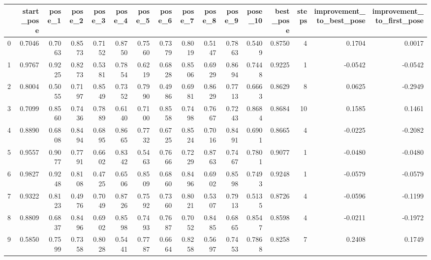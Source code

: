 \begin{tabular}{lrrrrrrrrrrrrrrr}
\toprule
{} &  start\_pose &  pose\_1 &  pose\_2 &  pose\_3 &  pose\_4 &  pose\_5 &  pose\_6 &  pose\_7 &  pose\_8 &  pose\_9 &  pose\_10 &  best\_pose &  steps &  improvement\_to\_best\_pose &  improvement\_to\_first\_pose \\
\midrule
0  &      0.7046 &  0.7063 &  0.8573 &  0.7152 &  0.8750 &  0.7560 &  0.7379 &  0.8019 &  0.5147 &  0.7863 &   0.5409 &     0.8750 &      4 &                    0.1704 &                     0.0017 \\
1  &      0.9767 &  0.9225 &  0.8273 &  0.5381 &  0.7854 &  0.6219 &  0.6828 &  0.8506 &  0.6929 &  0.8694 &   0.7448 &     0.9225 &      1 &                   -0.0542 &                    -0.0542 \\
2  &      0.8004 &  0.5055 &  0.7197 &  0.8549 &  0.7352 &  0.7990 &  0.4986 &  0.6981 &  0.8629 &  0.7713 &   0.6663 &     0.8629 &      8 &                    0.0625 &                    -0.2949 \\
3  &      0.7099 &  0.8560 &  0.7436 &  0.7889 &  0.6140 &  0.7100 &  0.8558 &  0.7498 &  0.7667 &  0.7243 &   0.8684 &     0.8684 &     10 &                    0.1585 &                     0.1461 \\
4  &      0.8890 &  0.6808 &  0.8494 &  0.6895 &  0.8665 &  0.7732 &  0.6725 &  0.8524 &  0.7016 &  0.8491 &   0.6901 &     0.8665 &      4 &                   -0.0225 &                    -0.2082 \\
5  &      0.9557 &  0.9077 &  0.7791 &  0.6602 &  0.8342 &  0.5463 &  0.7666 &  0.7229 &  0.8763 &  0.7467 &   0.7801 &     0.9077 &      1 &                   -0.0480 &                    -0.0480 \\
6  &      0.9827 &  0.9248 &  0.8108 &  0.4725 &  0.6506 &  0.8509 &  0.6860 &  0.8496 &  0.6902 &  0.8598 &   0.7493 &     0.9248 &      1 &                   -0.0579 &                    -0.0579 \\
7  &      0.9322 &  0.8123 &  0.4976 &  0.7049 &  0.8726 &  0.7592 &  0.7360 &  0.8021 &  0.5307 &  0.7913 &   0.5135 &     0.8726 &      4 &                   -0.0596 &                    -0.1199 \\
8  &      0.8809 &  0.6837 &  0.8496 &  0.6902 &  0.8598 &  0.7493 &  0.7687 &  0.7052 &  0.8485 &  0.6865 &   0.8547 &     0.8598 &      4 &                   -0.0211 &                    -0.1972 \\
9  &      0.5850 &  0.7599 &  0.7358 &  0.8028 &  0.5441 &  0.7787 &  0.6664 &  0.8258 &  0.5697 &  0.7453 &   0.7868 &     0.8258 &      7 &                    0.2408 &                     0.1749 \\

\end{tabular}
